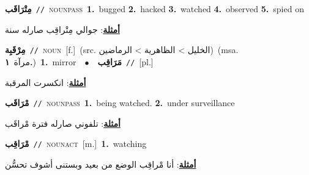 \documentclass[10pt,a4paper,twoside]{article} %
\begin{document}
\begin{multicols}{2}
{\setlength\topsep{0pt}\textbf{\foreignlanguage{arabic}{مِتْرَاقَب}}\ {\color{gray}\texttt{//}\color{black}}\ \textsc{noun\textunderscore pass}\ \textbf{1.}~bugged  \textbf{2.}~hacked  \textbf{3.}~watched  \textbf{4.}~observed  \textbf{5.}~spied on\  \begin{flushright}\color{gray}\foreignlanguage{arabic}{\textbf{\underline{\foreignlanguage{arabic}{أمثلة}}}: جوالي مِتْراقِب صارله سنة}\end{flushright}\color{black}} \vspace{2mm}

{\setlength\topsep{0pt}\textbf{\foreignlanguage{arabic}{مِرْقَبِة}}\ {\color{gray}\texttt{//}\color{black}}\ \textsc{noun}\ [f.]\ (src. \color{gray}\foreignlanguage{arabic}{الخليل > الظاهرية > الرماضين}\color{black})\ \color{gray}(msa. \foreignlanguage{arabic}{مرآة}~\foreignlanguage{arabic}{\textbf{١.}})\color{black}\ \textbf{1.}~mirror\ \ $\bullet$\ \ \setlength\topsep{0pt}\textbf{\foreignlanguage{arabic}{مَرَاقِب}}\ {\color{gray}\texttt{//}\color{black}}\ [pl.]\  \begin{flushright}\color{gray}\foreignlanguage{arabic}{\textbf{\underline{\foreignlanguage{arabic}{أمثلة}}}: انكسرت المرقبة}\end{flushright}\color{black}} \vspace{2mm}

{\setlength\topsep{0pt}\textbf{\foreignlanguage{arabic}{مْرَاقَب}}\ {\color{gray}\texttt{//}\color{black}}\ \textsc{noun\textunderscore pass}\ \textbf{1.}~being watched.  \textbf{2.}~under surveillance\  \begin{flushright}\color{gray}\foreignlanguage{arabic}{\textbf{\underline{\foreignlanguage{arabic}{أمثلة}}}: تلفوني صارله فترة مْراقَب}\end{flushright}\color{black}} \vspace{2mm}

{\setlength\topsep{0pt}\textbf{\foreignlanguage{arabic}{مْرَاقِب}}\ {\color{gray}\texttt{//}\color{black}}\ \textsc{noun\textunderscore act}\ [m.]\ \textbf{1.}~watching\  \begin{flushright}\color{gray}\foreignlanguage{arabic}{\textbf{\underline{\foreignlanguage{arabic}{أمثلة}}}: أنا مْراقِب الوضع من بعيد وبستنى أشوف تحسُّن}\end{flushright}\color{black}} \vspace{2mm}


\end{multicols}
\end{document}
